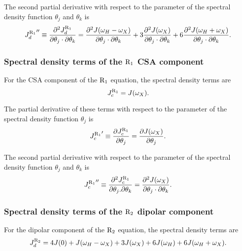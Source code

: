 \noindent The second partial derivative with respect to the parameter of the spectral density function $\theta_j$ and $\theta_k$ is
\begin{equation}
    {J_d^{\mathrm{R}_1}}'' \equiv \frac{\partial^2 J_d^{\mathrm{R}_1}}{\partial \theta_j \cdot \partial \theta_k}
        = \frac{\partial^2 J(\omega_H - \omega_X)}{\partial \theta_j \cdot \partial \theta_k}
        + 3 \frac{\partial^2 J(\omega_X)}{\partial \theta_j \cdot \partial \theta_k}
        + 6 \frac{\partial^2 J(\omega_H + \omega_X)}{\partial \theta_j \cdot \partial \theta_k}.  \label{eq: J terms: JR1d"}
\end{equation}


\subsubsection{Spectral density terms of the $\mathrm{R}_1$ CSA component}

For the CSA component of the $\mathrm{R}_1$ equation, the spectral density terms are
\begin{equation}
    J_c^{\mathrm{R}_1} = J(\omega_X).  \label{eq: J terms: JR1c}
\end{equation}

\noindent The partial derivative of these terms with respect to the parameter of the spectral density function $\theta_j$ is
\begin{equation}
    {J_c^{\mathrm{R}_1}}' \equiv \frac{\partial J_c^{\mathrm{R}_1}}{\partial \theta_j}
        = \frac{\partial J(\omega_X)}{\partial \theta_j}.  \label{eq: J terms: JR1c'}
\end{equation}

\noindent The second partial derivative with respect to the parameter of the spectral density function $\theta_j$ and $\theta_k$ is
\begin{equation}
    {J_c^{\mathrm{R}_1}}'' \equiv \frac{\partial^2 J_c^{\mathrm{R}_1}}{\partial \theta_j . \partial \theta_k}
        = \frac{\partial^2 J(\omega_X)}{\partial \theta_j \cdot \partial \theta_k}.  \label{eq: J terms: JR1c"}
\end{equation}


\subsubsection{Spectral density terms of the $\mathrm{R}_2$ dipolar component}

For the dipolar component of the $\mathrm{R}_2$ equation, the spectral density terms are
\begin{equation}
    J_d^{\mathrm{R}_2} = 4J(0) + J(\omega_H - \omega_X) + 3J(\omega_X) + 6J(\omega_H) + 6J(\omega_H + \omega_X).  \label{eq: J terms: JR2d}
\end{equation}

